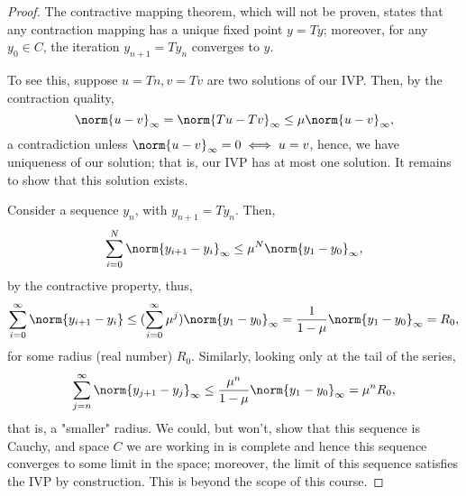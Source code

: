 \begin{proof}
    The contractive mapping theorem, which will not be proven, states that any contraction mapping has a unique fixed point $y = Ty$; moreover, for any $y_0 \in C$, the iteration $y_{n+1} = T y_n$ converges to $y$.

    To see this, suppose $u = Tn, v = Tv$ are two solutions of our IVP. Then, by the contraction quality, \[
    \norm{u-v}_\infty = \norm{Tu - Tv}_\infty \leq \mu \norm{u-v}_\infty ,   
    \]
    a contradiction unless $\norm{u-v}_\infty = 0 \iff u = v$, hence, we have uniqueness of our solution; that is, our IVP has at most one solution. It remains to show that this solution exists.

    Consider a sequence $y_n$, with $y_{n+1} = Ty_n$. Then, \begin{align*}
        \sum_{i=0}^N\norm{y_{i+1}-y_i}_\infty \leq \mu^N \norm{y_1 - y_0}_\infty,  
    \end{align*}
    by the contractive property, thus, \begin{align*}
        \sum_{i=0}^\infty  \norm{y_{i+1}-y_i} \leq (\sum_{i=0}^\infty \mu^j)\norm{y_1 - y_0}_\infty = \frac{1}{1-\mu} \norm{y_1 - y_0}_\infty = R_0,
    \end{align*}
    for some radius (real number) $R_0$. Similarly, looking only at the tail of the series,
    \[
    \sum_{j=n}^\infty \norm{y_{j+1}-y_j}_\infty \leq \frac{\mu^n}{1-\mu} \norm{y_1 - y_0}_\infty = \mu^n R_0,
    \]
    that is, a "smaller" radius. We could, but won't, show that this sequence is Cauchy, and space $C$ we are working in is complete and hence this sequence converges to some limit in the space; moreover, the limit of this sequence satisfies the IVP by construction. This is beyond the scope of this course.
\end{proof}